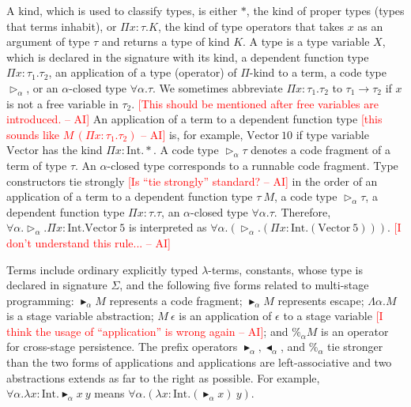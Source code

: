 \documentclass[runningheads]{llncs}
\newcommand{\red}[1]{\textcolor{red}{#1 }}
\newcommand{\TW}{{\mathop{\triangleright}}}
\newcommand{\F}{\forall}
\newcommand{\TB}{{\mathop{\blacktriangleright}}}
\newcommand{\TBL}{{\mathop{\blacktriangleleft}}}
\newcommand{\I}{\textrm{Int}}
\newcommand{\AI}[1]{\textcolor{red}{[#1 -- AI]}}
\begin{document}



A kind, which is used to classify types, is either $*$, the kind of
proper types (types that terms inhabit), or $\Pi x\colon\tau.K$, the kind
of type operators that takes $x$ as an argument of type $\tau$ and returns a type
of kind $K$.
A type is a type variable $X$, which is declared in the signature with its kind, a dependent function type $\Pi x:\tau_1.\tau_2$,
an application of a type (operator) of $\Pi$-kind to a term, a code type $\TW_\alpha$, or an $\alpha$-closed type $\F\alpha.\tau$.
We sometimes abbreviate $\Pi x:\tau_1.\tau_2$ to $\tau_1 \rightarrow \tau_2$ if
$x$ is not a free variable in $\tau_2$. \AI{This should be mentioned after free variables are introduced.}
An application of a term to a dependent function type \AI{this sounds like $M\, (\Pi x:\tau_1.\tau_2)$} is, for example, $\text{Vector}\ 10$
if type variable $\text{Vector}$ has the kind $\Pi x:\I.*$.
A code type $\TW_\alpha \tau$ denotes a code fragment of a term of type $\tau$.
An $\alpha$-closed type corresponds to a runnable code fragment.
Type constructors tie strongly \AI{Is ``tie strongly'' standard?} in the order of 
an application of a term to a dependent function type $\tau\ M$,
a code type $\TW_{\alpha} \tau$,
a dependent function type $\Pi x:\tau.\tau$, 
an $\alpha$-closed type $\F\alpha.\tau$.
Therefore, $\F\alpha.\TW_{\alpha}.\Pi x:\I.\text{Vector}\ 5$ is interpreted as
$\F\alpha.(\TW_{\alpha}.(\Pi x:\I.(\text{Vector}\ 5)))$. \AI{I don't understand this rule...}


Terms include ordinary explicitly typed \(\lambda\)-terms, constants,
whose type is declared in signature $\Sigma$, and the following five forms
related to multi-stage programming:
$\TB_\alpha M$ represents a code fragment; $\TB_\alpha M$ represents escape;
$\Lambda\alpha.M$ is a stage variable abstraction;
$M\ \epsilon$ is an application of $\epsilon$ to a stage variable \AI{I think the usage of ``application'' is wrong again}; and 
$\%_\alpha M$ is an operator for cross-stage persistence.
The prefix operators $\TB_\alpha, \TBL_\alpha$, and $\%_\alpha$ tie stronger than the two forms of applications
and applications are left-associative
and two abstractions extends as far to the right as possible.
For example, $\F\alpha.\lambda x:\I.\TB_\alpha x\ y$ means $\F\alpha.(\lambda x:\I.(\TB_\alpha x)\ y)$.
\end{document}
